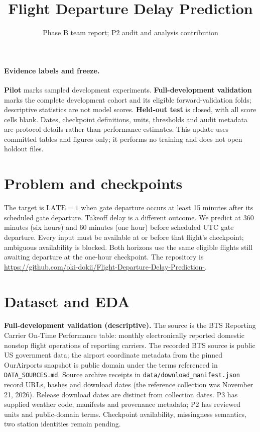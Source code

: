 \documentclass{article}
\title{Flight Departure Delay Prediction}
\author{Phase B team report; P2 audit and analysis contribution}
\begin{document}
\maketitle
\paragraph{Evidence labels and freeze.} \textbf{Pilot} marks sampled development experiments. \textbf{Full-development validation} marks the complete development cohort and its eligible forward-validation folds; descriptive statistics are not model scores. \textbf{Held-out test} is closed, with all score cells blank. Dates, checkpoint definitions, units, thresholds and audit metadata are protocol details rather than performance estimates. This update uses committed tables and figures only; it performs no training and does not open holdout files.
\section{Problem and checkpoints}
The target is \(\mathrm{LATE}=1\) when gate departure occurs at least 15 minutes after its scheduled gate departure. Takeoff delay is a different outcome. We predict at 360 minutes (six hours) and 60 minutes (one hour) before scheduled UTC gate departure. Every input must be available at or before that flight's checkpoint; ambiguous availability is blocked. Both horizons use the same eligible flights still awaiting departure at the one-hour checkpoint. The repository is \url{https://github.com/oki-dokii/Flight-Departure-Delay-Prediction-}.
\section{Dataset and EDA}
\textbf{Full-development validation (descriptive).}
The source is the BTS Reporting Carrier On-Time Performance table: monthly electronically reported domestic nonstop flight operations of reporting carriers. The recorded BTS source is public US government data; the airport coordinate metadata from the pinned OurAirports snapshot is public domain under the terms referenced in \texttt{DATA\_SOURCES.md}. Source archive receipts in \texttt{data/download\_manifest.json} record URLs, hashes and download dates (the reference collection was November 21, 2026). Release download dates are distinct from collection dates. P3 has supplied weather code, manifests and provenance metadata; P2 has reviewed units and public-domain terms. Checkpoint availability, missingness semantics, two station identities remain pending.
\end{document}
